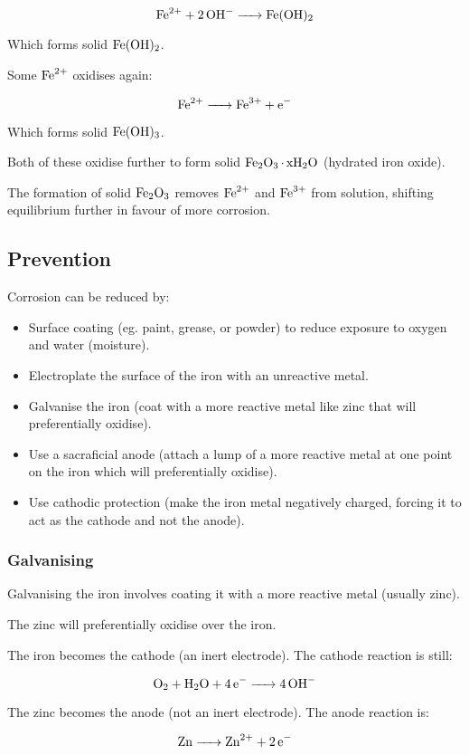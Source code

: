 \documentclass[a4paper,11pt]{article}
\begin{document}
$$
\ce{Fe^{2+} + 2OH- -> Fe(OH)2}
$$

Which forms solid $\ce{Fe(OH)2}$.

Some $\ce{Fe^{2+}}$ oxidises again:

$$
\ce{Fe^{2+} -> Fe^{3+} + e-}
$$

Which forms solid $\ce{Fe(OH)3}$.

Both of these oxidise further to form solid $\ce{Fe2O3.xH2O}$ (hydrated iron
oxide).

The formation of solid $\ce{Fe2O3}$ removes $\ce{Fe^{2+}}$ and $\ce{Fe^{3+}}$
from solution, shifting equilibrium further in favour of more corrosion.

\subsection{Prevention}

Corrosion can be reduced by:

\begin{itemize}
\item Surface coating (eg. paint, grease, or powder) to reduce exposure to
	oxygen and water (moisture).
\item Electroplate the surface of the iron with an unreactive metal.
\item Galvanise the iron (coat with a more reactive metal like zinc that will
	preferentially oxidise).
\item Use a sacraficial anode (attach a lump of a more reactive metal at one
	point on the iron which will preferentially oxidise).
\item Use cathodic protection (make the iron metal negatively charged, forcing
	it to act as the cathode and not the anode).
\end{itemize}

\subsubsection{Galvanising}

Galvanising the iron involves coating it with a more reactive metal (usually
zinc).

The zinc will preferentially oxidise over the iron.

The iron becomes the cathode (an inert electrode). The cathode reaction is
still:

$$
\ce{O2 + H2O + 4e- -> 4OH-}
$$

The zinc becomes the anode (not an inert electrode). The anode reaction is:

$$
\ce{Zn -> Zn^{2+} + 2e-}
$$
\end{document}
